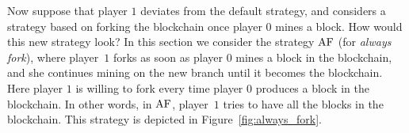 \documentclass[a4paper,english,cleveref, autoref,numberwithinsect]{lipics-v2019}
\newcommand{\df}{\text{\rm DF}}
\newcommand{\af}{\text{\rm AF}}
\newcommand{\pf}[1]{\text{\rm F[{#1}]}}
\begin{document}
Now suppose that player $1$ deviates from the default strategy, and considers a strategy based on forking the blockchain once player $0$ mines a block. 
How would this new strategy look? 
In this section we 
%
%
consider the strategy $\af$ (for \emph{always fork}), where player~$1$ forks as soon as player $0$ mines a block in the blockchain, and she continues mining on the new branch until it becomes the blockchain. Here player $1$ is willing to fork every time player $0$ produces a block in the blockchain. In other words, 
in $\af$, player~$1$ tries to have all the blocks in the blockchain. This strategy is depicted in Figure~\ref{fig:always_fork}.
\end{document}
